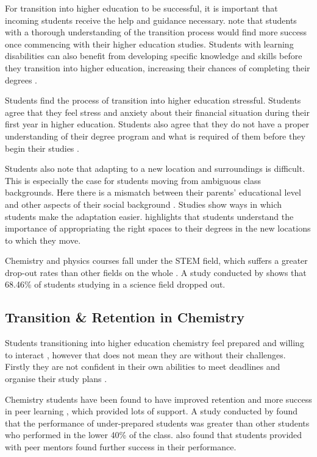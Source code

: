 \documentclass{l4proj}
\begin{document}
For transition into higher education to be successful,  it is important that incoming students receive the help and guidance necessary. \citep{briggs2012building} note that students with a thorough understanding of the transition process would find more success once commencing with their higher education studies. Students with learning disabilities can also benefit from developing specific knowledge and skills before they transition into higher education,  increasing their chances of completing their degrees \citep{milsom2005assisting}.

Students find the process of transition into higher education stressful. Students agree that they feel stress and anxiety about their financial situation during their first year in higher education. Students also agree that they do not have a proper understanding of their degree program and what is required of them before they begin their studies \citep{briggs2012building}. 

Students also note that adapting to a new location and surroundings is difficult. This is especially the case for students moving from ambiguous class backgrounds. Here there is a mismatch between their parents’ educational level and other aspects of their social background \citep{ivemark2021habitus}. Studies show ways in which students make the adaptation easier. \citet{holton2015adapting} highlights that students understand the importance of appropriating the right spaces to their degrees in the new locations to which they move.

Chemistry and physics courses fall under the STEM field,  which suffers a greater drop-out rates than other fields on the whole \citep{freeman2001recruiting}. A study conducted by \citet{echchafi2021analytical} shows that 68.46\% of students studying in a science field dropped out.

\subsection{Transition \& Retention in Chemistry}
Students transitioning into higher education chemistry feel prepared and willing to interact \citep{lovatt2013investigating},  however that does not mean they are without their challenges. Firstly they are not confident in their own abilities to meet deadlines and organise their study plans \citep{lovatt2013investigating}.

Chemistry students have been found to have improved retention and more success in peer learning \citep{kingsepp2020analyzing},  which provided lots of support. A study conducted by \citet{shields2012transition} found that the performance of under-prepared students was greater than other students who performed in the lower 40\% of the class. \citet{shields2012transition} also found that students provided with peer mentors found further success in their performance.
\end{document}
